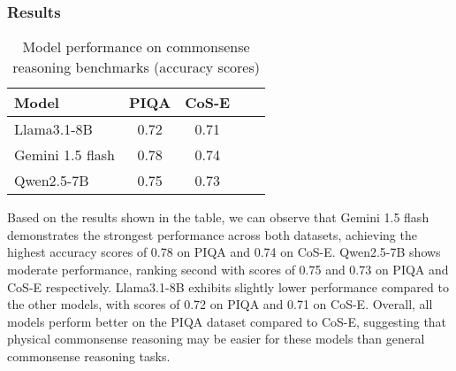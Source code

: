\subsubsection{Results}


\begin{table}[ht]
  \centering
  \begin{tabular}{|l|c|c|c|c|}
      \hline
      \textbf{Model} & \textbf{PIQA} & \textbf{CoS-E} \\ \hline
      
      Llama3.1-8B & 0.72 & 0.71 \\ \hline
      
      Gemini 1.5 flash & 0.78 & 0.74 \\ \hline
      
      Qwen2.5-7B & 0.75 & 0.73 \\ \hline

  \end{tabular}
  \caption{Model performance on commonsense reasoning benchmarks (accuracy scores)}
  \label{tab:model_comparison}
\end{table}

Based on the results shown in the table, we can observe that Gemini 1.5 flash demonstrates the strongest performance across both datasets, achieving the highest accuracy scores of 0.78 on PIQA and 0.74 on CoS-E. Qwen2.5-7B shows moderate performance, ranking second with scores of 0.75 and 0.73 on PIQA and CoS-E respectively. Llama3.1-8B exhibits slightly lower performance compared to the other models, with scores of 0.72 on PIQA and 0.71 on CoS-E. Overall, all models perform better on the PIQA dataset compared to CoS-E, suggesting that physical commonsense reasoning may be easier for these models than general commonsense reasoning tasks.


